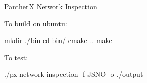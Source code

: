 PantherX Network Inspection

To build on ubuntu\+:


\begin{DoxyCode}
mkdir ./bin
cd bin/
cmake ..
make
\end{DoxyCode}


To test\+:

{\ttfamily ./px-\/network-\/inspection -\/f J\+S\+NO -\/o ./output} 